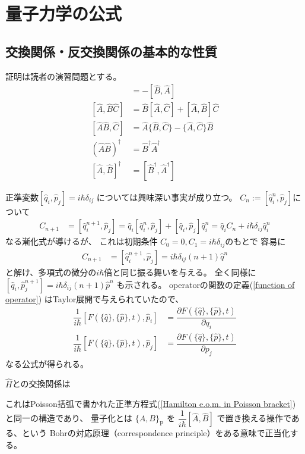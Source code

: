 \appendix
\renewcommand{\theequation}{A.\arabic{section}.\arabic{equation}}
\setcounter{equation}{0}

\section{量子力学の公式}

\subsection{交換関係・反交換関係の基本的な性質}

証明は読者の演習問題とする。
\begin{align}
    [\hat{A}, \hat{B}] &= - [\hat{B}, \hat{A}]
\\
    [\hat{A}, \hat{B}\hat{C}]
   &=
   \hat{B}[\hat{A}, \hat{C}]
+
    [\hat{A}, \hat{B}] \hat{C}
\label{A,BC to B(A,C) + (A,B)C}
\\
    [\hat{A}\hat{B}, \hat{C}]
   &=
   \hat{A}\{\hat{B}, \hat{C}\}
-
    \{\hat{A}, \hat{C}\} \hat{B}
\\
    \left(\hat{A}\hat{B}\right)^\dagger
    &=
    \hat{B}^\dagger\hat{A}^\dagger
\\
    [\hat{A}, \hat{B}]^\dagger
    &=
    [\hat{B}^\dagger, \hat{A}^\dagger]
\end{align}

正準変数$[\hat{q}_i, \hat{p}_j] = i\hbar\delta_{ij}$
については興味深い事実が成り立つ。
$C_n := [\hat{q}^n_i, \hat{p}_j]$について
\begin{align}
    C_{n+1}
    &=
    [\hat{q}^{n+1}_i, \hat{p}_j]
    =
    \hat{q}_i [\hat{q}_i^n, \hat{p}_j]
    +
    [\hat{q}_i, \hat{p}_j] \hat{q}_i^n
    =
    \hat{q}_i C_n
    +
    i\hbar\delta_{ij} \hat{q}_i^n
\end{align}
なる漸化式が導けるが、
これは初期条件
$C_0  = 0, C_1 = i\hbar\delta_{ij}$のもとで
容易に
\begin{align}
    C_{n+1} &= [\hat{q}^{n+1}_i, \hat{p}_j]
    = i\hbar\delta_{ij} (n+1) \hat{q}^n
\end{align}
と解け、多項式の微分の$i\hbar$倍と同じ振る舞いを与える。
全く同様に
$[\hat{q}_i, \hat{p}^{n+1}_j]
= i\hbar\delta_{ij} (n+1) \hat{p}^n$
も示される。
operatorの関数の定義(\ref{function of operator})
はTaylor展開で与えられていたので、
\begin{align}
    \dfrac{1}{i\hbar}
    [F(\{ \hat{q} \},\{ \hat{p} \}, t), \hat{p}_i]
    &=
    \dfrac{
        \partial F(\{ \hat{q} \},\{ \hat{p} \}, t)
    }{
        \partial q_i
    }
\\
    \dfrac{1}{i\hbar}
    [F(\{ \hat{q} \},\{ \hat{p} \}, t), \hat{p}_j]
    &=
    \dfrac{
        \partial F(\{ \hat{q} \},\{ \hat{p} \}, t)
    }{
        \partial p_j
    }
\end{align}
なる公式が得られる。

$\hat{H}$との交換関係は

これはPoisson括弧で書かれた正準方程式(\ref{Hamilton e.o.m. in Poisson bracket})
と同一の構造であり、
量子化とは
$\{A, B\}_{ \mathrm{P} }$
を
$\dfrac{1}{i\hbar} [\hat{A}, \hat{B}]$
で置き換える操作である、という
Bohrの対応原理（correspondence principle）をある意味で正当化する。
